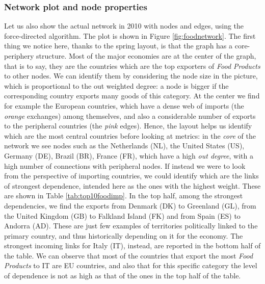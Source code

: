 \subsubsection*{Network plot and node properties}

Let us also show the actual network in 2010 with nodes and edges, using the force-directed algorithm. The plot is shown in Figure \ref{fig:foodnetwork}. The first thing we notice here, thanks to the spring layout, is that the graph has a core-periphery structure. Most of the major economies are at the center of the graph, that is to say, they are the countries which are the top exporters of \textit{Food Products} to other nodes. We can identify them by considering the node size in the picture, which is proportional to the out weighted degree: a node is bigger if the corresponding country exports many goods of this category. At the center we find for example the European countries, which have a dense web of imports (the \textit{orange} exchanges) among themselves, and also a considerable number of exports to the peripheral countries (the \textit{pink} edges). Hence, the layout helps us identify which are the most central countries before looking at metrics: in the \textit{core} of the network we see nodes such as the Netherlands (NL), the United States (US), Germany (DE), Brazil (BR), France (FR), which have a high \textit{out degree}, with a high number of connections with peripheral nodes. If instead we were to look from the perspective of importing countries, we could identify which are the links of strongest dependence, intended here as the ones with the highest weight. These are shown in Table \ref{tab:top10foodimp}. In the top half, among the strongest dependencies, we find the exports from Denmark (DK) to Greenland (GL), from the United Kingdom (GB) to Falkland Island (FK) and from Spain (ES) to Andorra (AD). These are just few examples of territories politically linked to the primary country, and thus historically depending on it for the economy. The strongest incoming links for Italy (IT), instead, are reported in the bottom half of the table. We can observe that most of the countries that export the most \textit{Food Products} to IT are EU countries, and also that for this specific category the level of dependence is not as high as that of the ones in the top half of the table.


